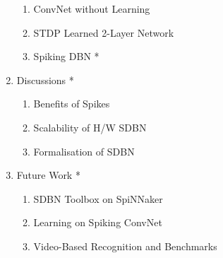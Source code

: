 \documentclass[journal]{journal}
\begin{document}
\begin{appendices}
\begin{enumerate}
			\begin{enumerate}
				\item ConvNet without Learning
				\item STDP Learned 2-Layer Network
				\item Spiking DBN *
			\end{enumerate}	
		\item Discussions *
			\begin{enumerate}
				\item Benefits of Spikes
				\item Scalability of H/W SDBN
				\item Formalisation of SDBN
			\end{enumerate}					
		\item Future Work *
			\begin{enumerate}
				\item SDBN Toolbox on SpiNNaker
				\item Learning on Spiking ConvNet
				\item Video-Based Recognition and Benchmarks
			\end{enumerate}					
	\end{enumerate}	
\end{appendices}


\end{document}
